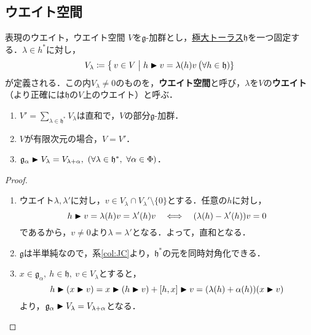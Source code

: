 \documentclass[rep_main]{subfiles}
\begin{document}
\subsection{ウエイト空間}
\begin{mydef}[label=def:weightspacerep]{表現のウエイト，ウエイト空間}
	$V$を$\mathfrak{g}$-加群とし，\hyperref[def:toral-subLieAlg]{極大トーラス}$\mathfrak{h}$を一つ固定する．$\lambda \in h^*$に対し，
	\begin{align}
		V_\lambda \coloneqq \bigl\{\, v \in V \bigm| h \blacktriangleright v = \lambda(h) v \,\bigr (\forall h \in \mathfrak{h})\} 
	\end{align}
	が定義される．この内$V_\lambda \neq 0$のものを，\textbf{ウエイト空間}と呼び，$\lambda$を$V$の\textbf{ウエイト}（より正確には$\mathfrak{h}$の$V$上のウエイト）と呼ぶ．
\end{mydef}
\begin{mylem}[label=lem:weightspacerep]{}
	\begin{enumerate}
		\item $V' = \sum_{\lambda \in \mathfrak{h}^*} V_\lambda$は直和で，$V$の部分$\mathfrak{g}$-加群．
		\item $V$が有限次元の場合，$V = V'$．
		\item $\mathfrak{g}_\alpha \blacktriangleright V_\lambda = V_{\lambda + \alpha},\ (\forall \lambda \in \mathfrak{h}^*,\ \forall \alpha \in \Phi)$．
	\end{enumerate}
\end{mylem}
\begin{proof}
	\begin{enumerate}
		\item ウエイト$\lambda, \lambda'$に対し，$v \in V_\lambda \cap V_\lambda' \setminus \{0\}$とする．任意の$h$に対し，
		\begin{equation}
			h \blacktriangleright v = \lambda(h)v = \lambda'(h)v  \quad \Longleftrightarrow \quad  (\lambda(h) - \lambda'(h))v = 0 
		\end{equation}
		であるから，$v \neq 0$より$\lambda = \lambda'$となる．よって，直和となる．
		\item $\mathfrak{g}$は半単純なので，系\ref{col:JC}より，$\mathfrak{h}^*$の元を同時対角化できる．
		\item $x \in \mathfrak{g}_\alpha,\ h \in \mathfrak{h},\ v \in V_\lambda$とすると，
		\begin{equation}
			h \blacktriangleright (x \blacktriangleright v) = x \blacktriangleright (h \blacktriangleright v) + [h, x] \blacktriangleright v = (\lambda(h) + \alpha(h))(x \blacktriangleright v)
		\end{equation}
		より，$\mathfrak{g}_\alpha \blacktriangleright V_\lambda = V_{\lambda + \alpha}$となる．
	\end{enumerate}
\end{proof}
\end{document}
